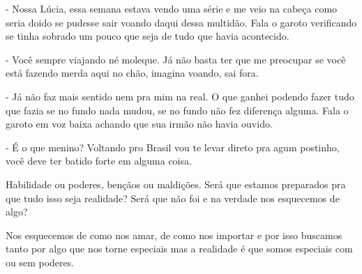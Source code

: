 - Nossa Lúcia, essa semana estava vendo uma série e me veio na cabeça como seria doido se pudesse sair voando daqui dessa multidão. Fala o garoto verificando se tinha sobrado um pouco que seja de tudo que havia acontecido.

- Você sempre viajando né moleque. Já não basta ter que me preocupar se você está fazendo merda aqui no chão, imagina voando, sai fora.

- Já não faz mais sentido nem pra mim na real. O que ganhei podendo fazer tudo que fazia se no fundo nada mudou, se no fundo não fez diferença alguma. Fala o garoto em voz baixa achando que sua irmão não havia ouvido.

- É o que menino? Voltando pro Brasil vou te levar direto pra agum postinho, você deve ter batido forte em alguma coisa.

Habilidade ou poderes, bençãos ou maldições. Será que estamos preparados pra que tudo isso seja realidade? Será que não foi e na verdade nos esquecemos de algo? 

Nos esquecemos de como nos amar, de como nos importar e por isso buscamos tanto por algo que nos torne especiais mas a realidade é que somos especiais com ou sem poderes.